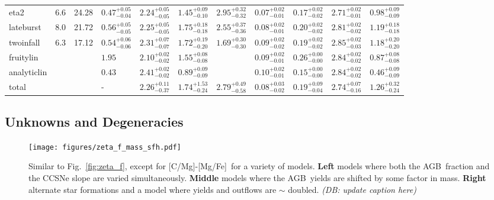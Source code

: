 \documentclass[fleqn,
usenatbib]{mnras}
\newcommand{\agb}{AGB}
\newcommand{\caafe}{[C/Mg]-[Mg/Fe]}
\newcommand{\dbnote}[1]{ {\color{Thistle} \textit{\small (DB: #1)}} }
\begin{document}
\begin{table}
{\begin{tabular}{l l l l l l l l l l l}
eta2             &      6.6 &    24.28 & $0.47^{+0.05}_{-0.04}$  &  $2.24^{+0.05}_{-0.05}$  &  $1.45^{+0.09}_{-0.10}$  &  $2.95^{+0.32}_{-0.32}$  &  $0.07^{+0.02}_{-0.01}$  &  $0.17^{+0.02}_{-0.02}$  &  $2.71^{+0.02}_{-0.01}$  &  $0.98^{+0.09}_{-0.09}$\\ 
lateburst        &      8.0 &    21.72 & $0.56^{+0.05}_{-0.05}$  &  $2.25^{+0.05}_{-0.05}$  &  $1.75^{+0.18}_{-0.18}$  &  $2.55^{+0.37}_{-0.36}$  &  $0.08^{+0.02}_{-0.01}$  &  $0.20^{+0.02}_{-0.02}$  &  $2.81^{+0.02}_{-0.02}$  &  $1.19^{+0.18}_{-0.18}$\\ 
twoinfall        &      6.3 &    17.12 & $0.54^{+0.06}_{-0.06}$  &  $2.31^{+0.07}_{-0.07}$  &  $1.72^{+0.19}_{-0.20}$  &  $1.69^{+0.30}_{-0.30}$  &  $0.09^{+0.02}_{-0.02}$  &  $0.19^{+0.02}_{-0.02}$  &  $2.85^{+0.02}_{-0.03}$  &  $1.18^{+0.20}_{-0.20}$\\ 
fruitylin       &    &    & $1.95$  &  $2.10^{+0.02}_{-0.02}$  &  $1.55^{+0.08}_{-0.08}$  &     &  $0.09^{+0.02}_{-0.01}$  &  $0.26^{+0.00}_{-0.00}$  &  $2.84^{+0.02}_{-0.02}$  &  $0.87^{+0.08}_{-0.08}$\\ 
analyticlin     &    &    & $0.43$  &  $2.41^{+0.02}_{-0.02}$  &  $0.89^{+0.09}_{-0.09}$  &     &  $0.10^{+0.02}_{-0.01}$  &  $0.15^{+0.00}_{-0.00}$  &  $2.84^{+0.02}_{-0.02}$  &  $0.46^{+0.09}_{-0.09}$\\ 
\hline
total & &   &  -  &  $2.26^{+0.11}_{-0.37}$  &  $1.74^{+1.53}_{-0.24}$  &  $2.79^{+0.49}_{-0.58}$  &  $0.08^{+0.03}_{-0.02}$  &  $0.19^{+0.09}_{-0.04}$  &  $2.74^{+0.07}_{-0.16}$  &  $1.26^{+0.32}_{-0.24}$\\
\hline
    \end{tabular}

}
    
\end{table}


\subsection{Unknowns and Degeneracies} \label{sec:sfh} \label{sec:outflows}
\label{sec:degeneracies}

\begin{figure}
    \texttt{[image: figures/zeta\_f\_mass\_sfh.pdf]}
    
    \caption[]{
        Similar to Fig.~\ref{fig:zeta_f}, except for \caafe\ for a variety of models.
        {\bf Left} models where both the \agb\ fraction and the CCSNe slope are varied simultaneously.
        {\bf Middle} models where the \agb\ yields are shifted by some factor in mass.
        {\bf Right} alternate star formations and a model where yields and outflows are $\sim$ doubled.
    \dbnote{update caption here}
    }
    \label{fig:sims_degens}
\end{figure}
\end{document}
